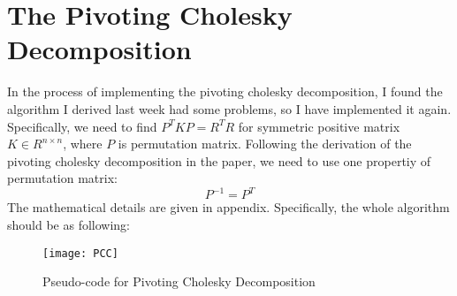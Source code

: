 \documentclass{article} %
\newcounter{math}
\begin{document}
\section{The Pivoting Cholesky Decomposition}
In the process of implementing the pivoting cholesky decomposition, I found the algorithm I derived last week had some problems, so I have implemented it again. Specifically, we need to find $P^TKP=R^TR$ for symmetric positive matrix $K\in R^{n\times n}$, where $P$ is permutation matrix. Following the derivation of the pivoting cholesky decomposition in the paper, we need to use one propertiy of permutation matrix:
\begin{equation}
P^{-1}=P^{T}
\end{equation}
The mathematical details are given in appendix. Specifically, the whole algorithm should be as following:
 \begin{figure}[h]
	\begin{center}
		\texttt{[image: PCC]}
	\end{center}
	\caption{Pseudo-code for Pivoting Cholesky Decomposition}
	\label{fig1}
\end{figure}
\end{document}
